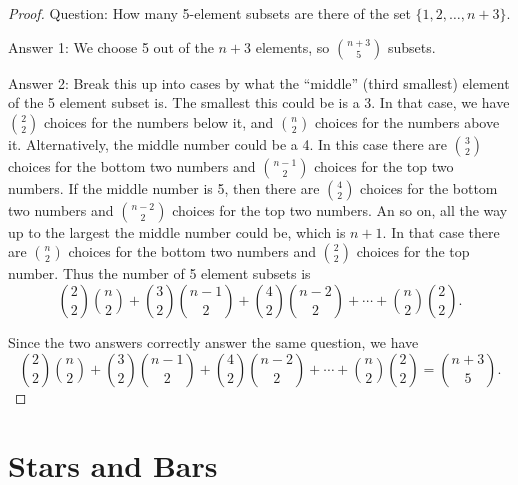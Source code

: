 \documentclass[10pt,]{book}
\theoremstyle{plain}
\theoremstyle{definition}
\theoremstyle{definition}
\theoremstyle{definition}
\numberwithin{equation}{section}
\begin{document}
\begin{exerciselist}
\begin{proof}
            Question: How many 5-element subsets are there of the set \(\{1,2,\ldots, n+3\}\).
\par

            Answer 1: We choose 5 out of the \(n+3\) elements, so \({n+3 \choose 5}\) subsets.
\par

            Answer 2: Break this up into cases by what the ``middle'' (third smallest) element of the 5 element subset is. The smallest this could be is a 3. In that case, we have \({2 \choose 2}\) choices for the numbers below it, and \({n \choose 2}\) choices for the numbers above it. Alternatively, the middle number could be a 4. In this case there are \({3 \choose 2}\) choices for the bottom two numbers and \({n-1 \choose 2}\) choices for the top two numbers. If the middle number is 5, then there are \({4 \choose 2}\) choices for the bottom two numbers and \({n-2 \choose 2}\) choices for the top two numbers. An so on, all the way up to the largest the middle number could be, which is \(n+1\). In that case there are \({n \choose 2}\) choices for the bottom two numbers and \({2 \choose 2}\) choices for the top number. Thus the number of 5 element subsets is
            \begin{equation*}
              {2 \choose 2}{n \choose 2} + {3 \choose 2}{n-1 \choose 2} + {4\choose 2}{n-2 \choose 2} + \cdots + {n\choose 2}{2\choose 2}.
            \end{equation*}
\par

            Since the two answers correctly answer the same question, we have
            \begin{equation*}
              {2 \choose 2}{n \choose 2} + {3 \choose 2}{n-1 \choose 2} + {4\choose 2}{n-2 \choose 2} + \cdots + {n\choose 2}{2\choose 2} = {n+3 \choose 5}.
            \end{equation*}
\end{proof}
\end{exerciselist}
\typeout{************************************************}
\typeout{************************************************}
\section[Stars and Bars]{Stars and Bars}\label{sec_stars-and-bars}
\end{document}
